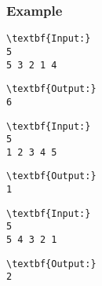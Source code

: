 \subsubsection{Example}
\begin{verbatim}
\textbf{Input:}
5
5 3 2 1 4\end{verbatim}
\begin{verbatim}
\textbf{Output:}
6\end{verbatim}
\begin{verbatim}
\textbf{Input:}
5
1 2 3 4 5\end{verbatim}
\begin{verbatim}
\textbf{Output:}
1\end{verbatim}
\begin{verbatim}
\textbf{Input:}
5
5 4 3 2 1\end{verbatim}
\begin{verbatim}
\textbf{Output:}
2\end{verbatim}

